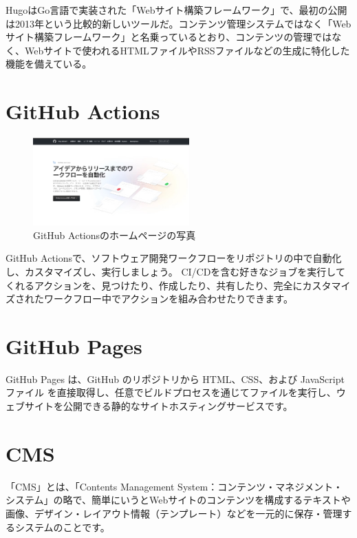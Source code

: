   \begin{tcolorbox}[title=Hugoとは]
    HugoはGo言語で実装された「Webサイト構築フレームワーク」で、最初の公開は2013年という比較的新しいツールだ。コンテンツ管理システムではなく「Webサイト構築フレームワーク」と名乗っているとおり、コンテンツの管理ではなく、Webサイトで使われるHTMLファイルやRSSファイルなどの生成に特化した機能を備えている。
    \cite{hugoとは} \cite{hugo公式}
  \end{tcolorbox}

\section{GitHub Actions}

  \begin{figure}[H]
    \centering
    \includegraphics[width=6cm]{./image/02-chap3/githubActions.png}
    \caption{GitHub Actionsのホームページの写真}
    \label{chap3-githubAction-image}
  \end{figure}

  \begin{tcolorbox}[title=GitHub Pagesとは]
    GitHub Actionsで、ソフトウェア開発ワークフローをリポジトリの中で自動化し、カスタマイズし、実行しましょう。 CI/CDを含む好きなジョブを実行してくれるアクションを、見つけたり、作成したり、共有したり、完全にカスタマイズされたワークフロー中でアクションを組み合わせたりできます。
    \cite{githubAction}
  \end{tcolorbox}

\section{GitHub Pages}

  \begin{tcolorbox}[title=Hugoとは]
    GitHub Pages は、GitHub のリポジトリから HTML、CSS、および JavaScript ファイル を直接取得し、任意でビルドプロセスを通じてファイルを実行し、ウェブサイトを公開できる静的なサイトホスティングサービスです。
    \cite{githubPages}
  \end{tcolorbox}


\section{CMS}

  \begin{tcolorbox}[title=CMSとは]
    「CMS」とは、「Contents Management System：コンテンツ・マネジメント・システム」の略で、簡単にいうとWebサイトのコンテンツを構成するテキストや画像、デザイン・レイアウト情報（テンプレート）などを一元的に保存・管理するシステムのことです。
    \cite{cmsとは}
  \end{tcolorbox}


